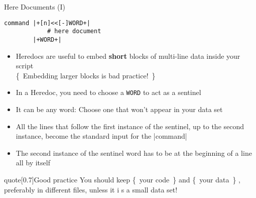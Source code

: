 \begin{frame}[fragile]{Here Documents (I)}
    \vspace{-3mm}
    \begin{lstlisting}[style=MyBash, numbers=none]
        command |+[n]<<[-]WORD+|
            # here document
        |+WORD+|
    \end{lstlisting}
    \begin{itemize}
        \item Heredocs are useful to embed \textbf{short} blocks of multi-line data inside your script\\[-0.5ex]
              {\tiny\{~Embedding larger blocks is bad practice!~\}}
        \item In a Heredoc, you need to choose a \texttt{WORD} to act as a sentinel
        \item It can be any word: Choose one that won't appear in your data set
        \item All the lines that follow the first instance of the sentinel, up to the second instance, become the standard input for the \bash|command| 
        \item The second instance of the sentinel word has to be \alert{at the beginning of a line all by itself}
    \end{itemize}
    \begin{varblock}{quote}[0.7\textwidth]{Good practice}
        \textnormal{You should keep  {\tiny\{~your code~\}} and  {\tiny\{~your data~\}} , preferably in different files, unless it i    s a small data set!}
    \end{varblock}
\end{frame}
